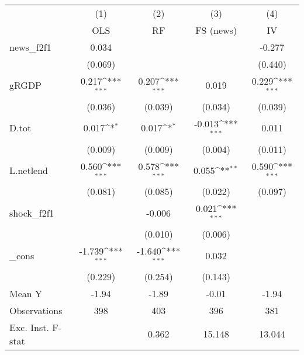 {
\def\sym#1{\ifmmode^{#1}\else\(^{#1}\)\fi}
\begin{tabular}{l*{4}{c}}
\toprule
            &\multicolumn{1}{c}{(1)}&\multicolumn{1}{c}{(2)}&\multicolumn{1}{c}{(3)}&\multicolumn{1}{c}{(4)}\\
            &\multicolumn{1}{c}{OLS}&\multicolumn{1}{c}{RF}&\multicolumn{1}{c}{FS (news)}&\multicolumn{1}{c}{IV}\\
\midrule
news\_f2f1   &       0.034         &                     &                     &      -0.277         \\
            &     (0.069)         &                     &                     &     (0.440)         \\
\addlinespace
gRGDP       &       0.217\sym{***}&       0.207\sym{***}&       0.019         &       0.229\sym{***}\\
            &     (0.036)         &     (0.039)         &     (0.034)         &     (0.039)         \\
\addlinespace
D.tot       &       0.017\sym{*}  &       0.017\sym{*}  &      -0.013\sym{***}&       0.011         \\
            &     (0.009)         &     (0.009)         &     (0.004)         &     (0.011)         \\
\addlinespace
L.netlend   &       0.560\sym{***}&       0.578\sym{***}&       0.055\sym{**} &       0.590\sym{***}\\
            &     (0.081)         &     (0.085)         &     (0.022)         &     (0.097)         \\
\addlinespace
shock\_f2f1  &                     &      -0.006         &       0.021\sym{***}&                     \\
            &                     &     (0.010)         &     (0.006)         &                     \\
\addlinespace
\_cons      &      -1.739\sym{***}&      -1.640\sym{***}&       0.032         &                     \\
            &     (0.229)         &     (0.254)         &     (0.143)         &                     \\
\midrule
Mean Y      &       -1.94         &       -1.89         &       -0.01         &       -1.94         \\
Observations&         398         &         403         &         396         &         381         \\
Exc. Inst. F-stat&                     &       0.362         &      15.148         &      13.044         \\
\bottomrule
\end{tabular}
}
